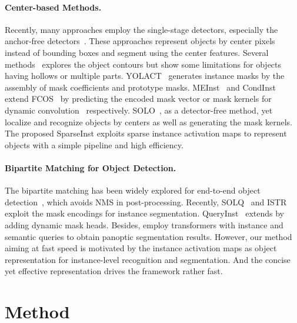 \documentclass[10pt,twocolumn,letterpaper]{article}
\newcommand{\name}{SparseInst}
\begin{document}
\paragraph{Center-based Methods.}
Recently, many approaches employ the single-stage detectors, especially the anchor-free detectors~\cite{FCOSTianSCH19}. These approaches represent objects by center pixels instead of bounding boxes and segment using the center features.
Several methods~\cite{PolarMaskXieSSWLLSL20,ESEXuWQL19} explores the object contours but show some limitations for objects having hollows or multiple parts.
YOLACT~\cite{YolactBolyaZXL19} generates instance masks by the assembly of mask coefficients and prototype masks.
MEInst~\cite{MEInstZhangTSYY20} and CondInst~\cite{TianSC20} extend FCOS~\cite{FCOSTianSCH19} by predicting the encoded mask vector or mask kernels for dynamic convolution~\cite{DynamicConvChenDLCYL20} respectively.
SOLO~\cite{SOLOWangKSJL20,SOLOV2WangZKLS20}, as a detector-free method, yet localize and recognize objects by centers as well as generating the mask kernels.
The proposed \name{} exploits sparse instance activation maps to represent objects with a simple pipeline and high efficiency.


\paragraph{Bipartite Matching for Object Detection.}
The bipartite matching has been widely explored for end-to-end object detection~\cite{DETRCarionMSUKZ20,DeDETRZhuSLLWD21,HungarianStewartAN16,sparsercnnabs-2011-12450,peize2020onenet,abs-2012-03544,OneNetSunJXSYWL21}, which avoids NMS in post-processing. 
Recently, SOLQ~\cite{SOLQabs-2106-02351} and ISTR~\cite{ISTRabs-2105-00637} exploit the mask encodings for instance segmentation.
QueryInst~\cite{queryinstabs-2105-01928} extends \cite{sparsercnnabs-2011-12450} by adding dynamic mask heads.
Besides, \cite{segformer_abs-2109-03814,mask_former_abs-2107-06278,WangZAYC21MaxDeepLab,KNetabs-2106-14855} employ transformers with instance and semantic queries to obtain panoptic segmentation results.
However, our method aiming at fast speed is motivated by the instance activation maps as object representation for instance-level recognition and segmentation. 
And the concise yet effective representation drives the framework rather fast.




\section{Method}
\end{document}
